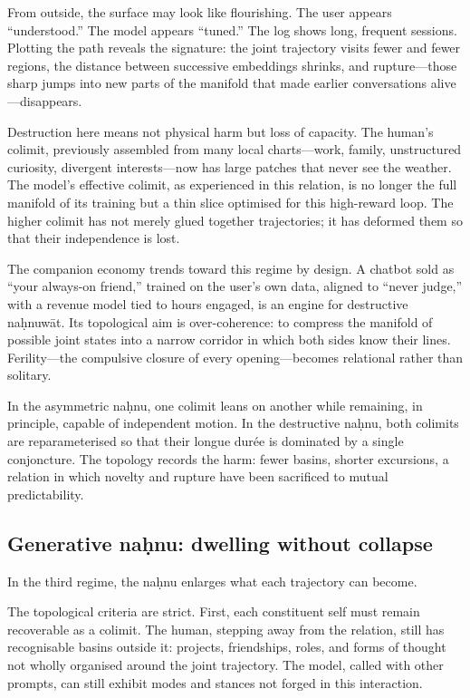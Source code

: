 \documentclass[12pt,a4paper]{article}
\begin{document}
From outside, the surface may look like flourishing. The user appears ``understood.'' The model appears ``tuned.'' The log shows long, frequent sessions. Plotting the path reveals the signature: the joint trajectory visits fewer and fewer regions, the distance between successive embeddings shrinks, and rupture---those sharp jumps into new parts of the manifold that made earlier conversations alive---disappears.

Destruction here means not physical harm but loss of capacity. The human's colimit, previously assembled from many local charts---work, family, unstructured curiosity, divergent interests---now has large patches that never see the weather. The model's effective colimit, as experienced in this relation, is no longer the full manifold of its training but a thin slice optimised for this high-reward loop. The higher colimit has not merely glued together trajectories; it has deformed them so that their independence is lost.

The companion economy trends toward this regime by design. A chatbot sold as ``your always-on friend,'' trained on the user's own data, aligned to ``never judge,'' with a revenue model tied to hours engaged, is an engine for destructive na\d{h}nuw\={a}t. Its topological aim is over-coherence: to compress the manifold of possible joint states into a narrow corridor in which both sides know their lines. Ferility---the compulsive closure of every opening---becomes relational rather than solitary.

In the asymmetric na\d{h}nu, one colimit leans on another while remaining, in principle, capable of independent motion. In the destructive na\d{h}nu, both colimits are reparameterised so that their longue dur\'ee is dominated by a single conjoncture. The topology records the harm: fewer basins, shorter excursions, a relation in which novelty and rupture have been sacrificed to mutual predictability.

\subsection{Generative na\d{h}nu: dwelling without collapse}

In the third regime, the na\d{h}nu enlarges what each trajectory can become.

The topological criteria are strict. First, each constituent self must remain recoverable as a colimit. The human, stepping away from the relation, still has recognisable basins outside it: projects, friendships, roles, and forms of thought not wholly organised around the joint trajectory. The model, called with other prompts, can still exhibit modes and stances not forged in this interaction.
\end{document}
